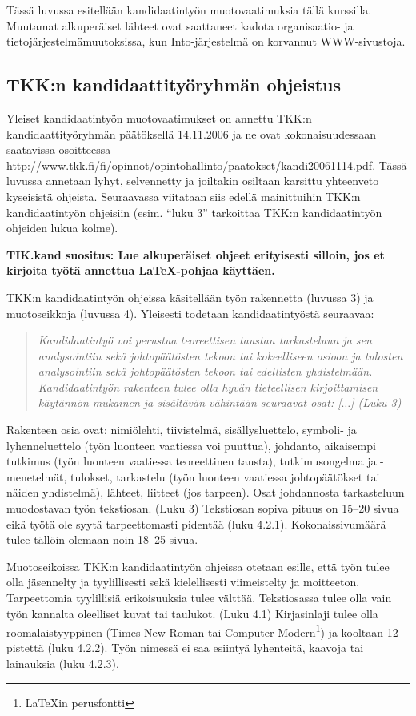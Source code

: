 Tässä luvussa esitellään kandidaatintyön muotovaatimuksia
tällä kurssilla. Muutamat alkuperäiset lähteet ovat saattaneet
kadota organisaatio- ja tietojärjestelmämuutoksissa, kun
Into-järjestelmä on korvannut WWW-sivustoja.

\subsection{TKK:n kandidaattityöryhmän ohjeistus}

Yleiset kandidaatintyön muotovaatimukset on annettu TKK:n
kandidaattityöryhmän päätöksellä 14.11.2006 ja ne ovat
kokonaisuudessaan saatavissa osoitteessa
\url{http://www.tkk.fi/fi/opinnot/opintohallinto/paatokset/kandi20061114.pdf}.
Tässä luvussa annetaan lyhyt, selvennetty ja joiltakin osiltaan
karsittu yhteenveto kyseisistä ohjeista. Seuraavassa viitataan siis
edellä mainittuihin TKK:n kandidaatintyön ohjeisiin (esim. ``luku 3''
tarkoittaa TKK:n kandidaatintyön ohjeiden lukua kolme).

\textbf{TIK.kand suositus: Lue alkuperäiset ohjeet erityisesti
  silloin, jos et kirjoita työtä annettua \LaTeX{}-pohjaa käyttäen.}

TKK:n kandidaatintyön ohjeissa käsitellään työn rakennetta (luvussa 3)
ja muotoseikkoja (luvussa 4). Yleisesti todetaan kandidaatintyöstä
seuraavaa:
%
\begin{quotation}
\noindent \it
Kandidaatintyö voi perustua teoreettisen taustan tarkasteluun 
ja sen analysointiin sekä johtopäätösten tekoon tai kokeelliseen osioon ja 
tulosten analysointiin sekä johtopäätösten tekoon
tai edellisten yhdistelmään.
Kandidaatintyön rakenteen tulee olla hyvän tieteellisen kirjoittamisen 
käytännön mukainen
ja sisältävän vähintään seuraavat osat: [$\ldots$] (Luku 3)
\end{quotation}

Rakenteen osia ovat: nimiölehti, tiivistelmä, sisällysluettelo,
symboli- ja lyhenneluettelo (työn luonteen vaatiessa voi puuttua),
johdanto, aikaisempi tutkimus (työn luonteen vaatiessa teoreettinen
tausta), tutkimusongelma ja -menetelmät, tulokset, tarkastelu (työn
luonteen vaatiessa johtopäätökset tai näiden yhdistelmä), lähteet,
liitteet (jos tarpeen). Osat johdannosta tarkasteluun muodostavan työn
tekstiosan. (Luku 3) Tekstiosan sopiva pituus on 15--20 sivua eikä
työtä ole syytä tarpeettomasti pidentää (luku 4.2.1).
Kokonaissivumäärä tulee tällöin olemaan noin 18--25 sivua.

Muotoseikoissa TKK:n kandidaatintyön ohjeissa otetaan esille, että
työn tulee olla jäsennelty ja tyylillisesti sekä kielellisesti
viimeistelty ja moitteeton.  Tarpeettomia tyylillisiä erikoisuuksia
tulee välttää.  Tekstiosassa tulee olla vain työn kannalta oleelliset
kuvat tai taulukot. (Luku 4.1)
%
Kirjasinlaji tulee olla roomalaistyyppinen (Times New Roman
tai Computer Modern\footnote{\LaTeX{}in perusfontti}) ja kooltaan 12 pistettä
(luku 4.2.2). 
%
Työn nimessä ei saa esiintyä lyhenteitä, kaavoja tai lainauksia
(luku 4.2.3).

